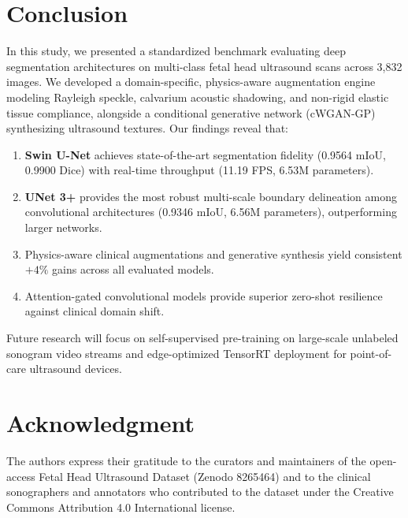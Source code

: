 \documentclass[conference]{IEEEtran}
\begin{document}
\section{Conclusion}
\label{sec:conclusion}
In this study, we presented a standardized benchmark evaluating deep segmentation architectures on multi-class fetal head ultrasound scans across 3,832 images. We developed a domain-specific, physics-aware augmentation engine modeling Rayleigh speckle, calvarium acoustic shadowing, and non-rigid elastic tissue compliance, alongside a conditional generative network (cWGAN-GP) synthesizing ultrasound textures. 
Our findings reveal that:
\begin{enumerate}
    \item \textbf{Swin U-Net} achieves state-of-the-art segmentation fidelity (0.9564 mIoU, 0.9900 Dice) with real-time throughput (11.19 FPS, 6.53M parameters).
    \item \textbf{UNet 3+} provides the most robust multi-scale boundary delineation among convolutional architectures (0.9346 mIoU, 6.56M parameters), outperforming larger networks.
    \item Physics-aware clinical augmentations and generative synthesis yield consistent $+4\%$ gains across all evaluated models.
    \item Attention-gated convolutional models provide superior zero-shot resilience against clinical domain shift.
\end{enumerate}

Future research will focus on self-supervised pre-training on large-scale unlabeled sonogram video streams and edge-optimized TensorRT deployment for point-of-care ultrasound devices.

\section*{Acknowledgment}
The authors express their gratitude to the curators and maintainers of the open-access Fetal Head Ultrasound Dataset (Zenodo 8265464) and to the clinical sonographers and annotators who contributed to the dataset under the Creative Commons Attribution 4.0 International license.
\end{document}
